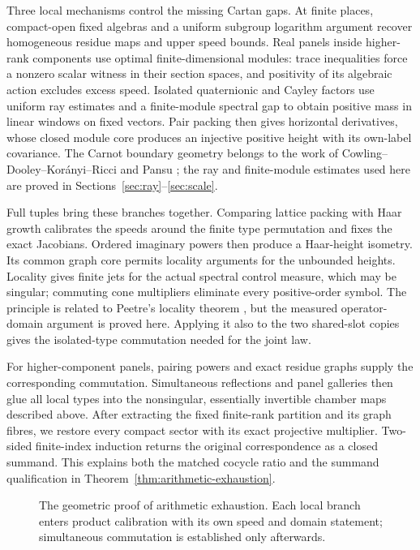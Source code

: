 Three local mechanisms control the missing Cartan gaps. At finite
places, compact-open fixed algebras and a uniform subgroup logarithm
argument recover homogeneous residue maps and upper speed bounds.
Real panels inside higher-rank components use optimal finite-dimensional
modules: trace inequalities force a nonzero scalar witness in their
section spaces, and positivity of its algebraic action excludes excess
speed. Isolated quaternionic and Cayley factors use uniform ray
estimates and a finite-module spectral gap to obtain positive mass in
linear windows on fixed vectors. Pair packing then gives horizontal
derivatives, whose closed module core produces an injective positive
height with its own-label covariance. The Carnot boundary geometry
belongs to the work of Cowling--Dooley--Kor\'anyi--Ricci and Pansu
\cite{CDKR1991,CDKR1998,Pansu1989}; the ray and finite-module estimates
used here are proved in Sections~\ref{sec:ray}--\ref{sec:scale}.

Full tuples bring these branches together. Comparing lattice packing
with Haar growth calibrates the speeds around the finite type
permutation and fixes the exact Jacobians. Ordered imaginary powers
then produce a Haar-height isometry. Its common graph core permits
locality arguments for the unbounded heights. Locality gives finite
jets for the actual spectral control measure, which may be singular;
commuting cone multipliers eliminate every positive-order symbol.
The principle is related to Peetre's locality theorem
\cite{Peetre1959,Peetre1960}, but the measured operator-domain argument
is proved here. Applying it also to the two shared-slot copies gives
the isolated-type commutation needed for the joint law.

For higher-component panels, pairing powers and exact residue graphs
supply the corresponding commutation. Simultaneous reflections and
panel galleries then glue all local types into the nonsingular,
essentially invertible chamber maps described above. After extracting
the fixed finite-rank partition and its graph fibres, we restore every
compact sector with its exact projective multiplier. Two-sided
finite-index induction returns the original correspondence as a closed
summand. This explains both the matched cocycle ratio and the summand
qualification in Theorem~\ref{thm:arithmetic-exhaustion}.

\begin{figure}[tbp]
 \centering
 
 \caption{The geometric proof of arithmetic exhaustion. Each local branch
 enters product calibration with its own speed and domain statement;
 simultaneous commutation is established only afterwards.}
 \label{fig:proof-map}
\end{figure}

